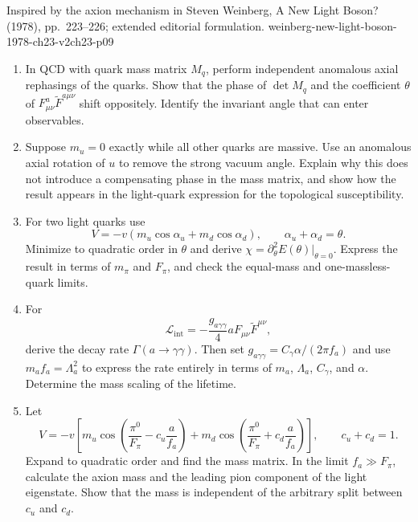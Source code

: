 \begin{enumerate}
  {Inspired by the axion mechanism in Steven Weinberg, A New Light
  Boson? (1978), pp.~223--226; extended editorial formulation.}
  {weinberg-new-light-boson-1978-ch23-v2ch23-p09}
  \begin{enumerate}
    \item[(a)]
    In QCD with quark mass matrix \(M_q\), perform independent anomalous
    axial rephasings of the quarks.  Show that the phase of
    \(\det M_q\) and the coefficient \(\theta\) of
    \(F_{\mu\nu}^a\widetilde F^{a\mu\nu}\) shift oppositely.  Identify the
    invariant angle that can enter observables.
    \item[(b)]
    Suppose \(m_u=0\) exactly while all other quarks are massive.  Use an
    anomalous axial rotation of \(u\) to remove the strong vacuum angle.
    Explain why this does not introduce a compensating phase in the mass
    matrix, and show how the result appears in the light-quark expression
    for the topological susceptibility.
    \item[(c)]
    For two light quarks use
    \[
      V=-v(m_u\cos\alpha_u+m_d\cos\alpha_d),\qquad
      \alpha_u+\alpha_d=\theta.
    \]
    Minimize to quadratic order in \(\theta\) and derive
    \(\chi=\partial_\theta^2E(\theta)|_{\theta=0}\).
    Express the result in terms of \(m_\pi\) and \(F_\pi\), and check the
    equal-mass and one-massless-quark limits.
    \item[(d)]
    For
    \[
      \mathcal L_{\mathrm{int}}
        =-\frac{g_{a\gamma\gamma}}4
         aF_{\mu\nu}\widetilde F^{\mu\nu},
    \]
    derive the decay rate \(\Gamma(a\to\gamma\gamma)\).  Then set
    \(g_{a\gamma\gamma}=C_\gamma\alpha/(2\pi f_a)\) and use
    \(m_af_a=\Lambda_a^2\) to express the rate entirely in terms of
    \(m_a\), \(\Lambda_a\), \(C_\gamma\), and \(\alpha\).  Determine the
    mass scaling of the lifetime.
    \item[(e)]
    Let
    \[
      V=-v\left[
        m_u\cos\left(\frac{\pi^0}{F_\pi}-c_u\frac a{f_a}\right)
        +m_d\cos\left(\frac{\pi^0}{F_\pi}+c_d\frac a{f_a}\right)
        \right],
      \qquad c_u+c_d=1.
    \]
    Expand to quadratic order and find the mass matrix.  In the limit
    \(f_a\gg F_\pi\), calculate the axion mass and the leading pion
    component of the light eigenstate.  Show that the mass is independent
    of the arbitrary split between \(c_u\) and \(c_d\).
  \end{enumerate}


\end{enumerate}
